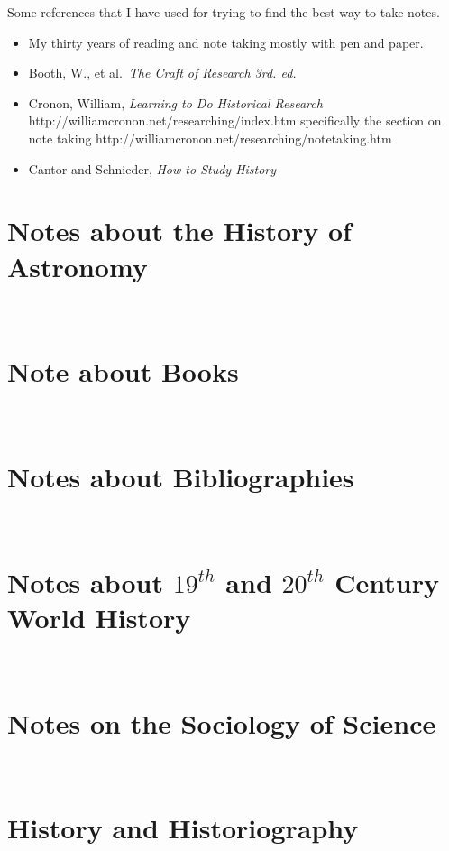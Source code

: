 \documentclass{article}
\begin{document}
Some references that I have used for trying to find the best way to take
notes.
\begin{itemize}
\item My thirty years of reading and note taking mostly with pen and  paper.
\item Booth, W., et al.\ {\it The Craft of Research 3rd. ed.}
  \cite{booth:2008}
\item Cronon, William, {\it Learning to Do Historical Research}
  http://williamcronon.net/researching/index.htm specifically the
  section on note taking
  http://williamcronon.net/researching/notetaking.htm
  \cite{cronon:2008}
\item Cantor and Schnieder, {\it How to Study History} \cite{cantor:1967}
\end{itemize}



\section{Notes about the History of Astronomy}\


\section{Note about Books}\


\section{Notes about Bibliographies}\


\section{Notes about \ensuremath{19^{th}} and \ensuremath{20^{th}} Century World History}\


%

\section{Notes on the Sociology of Science}\


\section{History and Historiography}\


\vfil\eject



\end{document}
